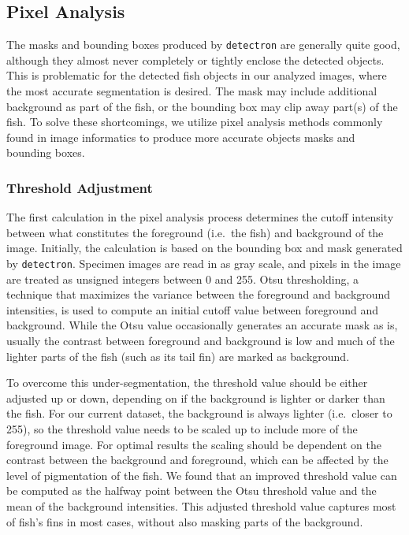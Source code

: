 \documentclass[screen,review]{acmart}
\begin{document}
\subsection{Pixel Analysis}
The masks and bounding boxes produced by \verb|detectron| are generally quite good, although they almost never completely or tightly enclose the
detected objects.
This is problematic for the detected fish objects in our analyzed images,
where the most accurate segmentation is desired.
The mask may include additional background as part of the fish, or the
bounding box may clip away part(s) of the fish. To solve these
shortcomings, we utilize pixel analysis methods commonly found in image
informatics to produce more accurate objects masks and bounding boxes.

\subsubsection{Threshold Adjustment}
The first calculation in the pixel analysis process determines the cutoff intensity between what constitutes the foreground (i.e.~the fish) and background of the image.
Initially, the calculation is based on the bounding box and mask generated by
\verb|detectron|. Specimen images are read in as gray scale, and pixels in the image are treated as unsigned integers between 0 and 255.
Otsu thresholding, a technique that maximizes the variance between the 
foreground and background intensities, is used to compute an initial cutoff value between foreground and background. 
While the Otsu value occasionally generates an accurate mask as is, usually
the contrast between foreground and background is low and much of the lighter parts of the fish (such as its tail fin) are marked as background.

To overcome this under-segmentation, the threshold value should be
either adjusted up or down, depending on if the background is lighter or darker than the fish.
For our current dataset, the background is always lighter (i.e.~closer to 255), so the threshold value needs to be scaled up to include more of the
foreground image.
For optimal results the scaling should be dependent on the
contrast between the background and foreground,
which can be affected by
the level of pigmentation of the fish.
We found that an improved threshold value can be computed as the halfway
point between the Otsu threshold value and the
mean of the background intensities.
This adjusted threshold value
captures most of fish's fins in most cases, without also masking parts of the background.
\end{document}
